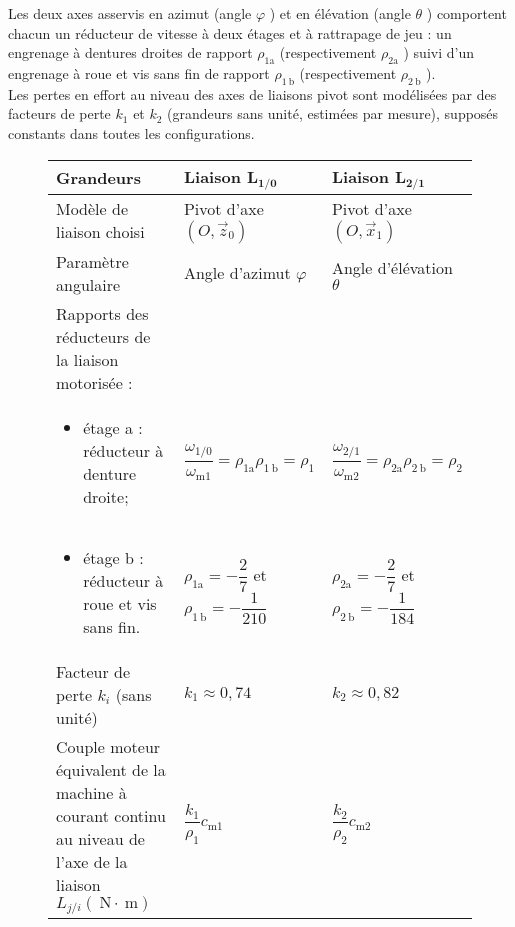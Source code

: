 Les deux axes asservis en azimut (angle $\varphi$ ) et en élévation (angle $\theta$ ) comportent chacun un réducteur de vitesse à deux étages et à rattrapage de jeu : un engrenage à dentures droites de rapport $\rho_{1 \mathrm{a}}$ (respectivement $\rho_{2 \mathrm{a}}$ ) suivi d'un engrenage à roue et vis sans fin de rapport $\rho_{1 \mathrm{~b}}$ (respectivement $\rho_{2 \mathrm{~b}}$ ).\\
Les pertes en effort au niveau des axes de liaisons pivot sont modélisées par des facteurs de perte $k_{1}$ et $k_{2}$ (grandeurs sans unité, estimées par mesure), supposés constants dans toutes les configurations.

\begin{figure}[!h]
\centering
\begin{tabular}{p{8cm}ll}
\hline
\textbf{Grandeurs} & \textbf{Liaison} $\boldsymbol{L}_{\mathbf{1 / 0}}$ & \textbf{Liaison} $\boldsymbol{L}_{\mathbf{2} / \mathbf{1}}$ \\
\hline
Modèle de liaison choisi & Pivot d'axe $\left(O, \vec{z}_{0}\right)$ & Pivot d'axe $\left(O, \vec{x}_{1}\right)$ \\

Paramètre angulaire & Angle d'azimut $\varphi$ & Angle d'élévation $\theta$ \\

Rapports des réducteurs de la liaison motorisée : & & \\

\begin{itemize}
\item étage a : réducteur à denture droite;
\end{itemize}
& $\dfrac{\omega_{1 / 0}}{\omega_{\mathrm{m} 1}}=\rho_{1 \mathrm{a}} \rho_{1 \mathrm{~b}}=\rho_{1}$ 
& $\dfrac{\omega_{2 / 1}}{\omega_{\mathrm{m} 2}}=\rho_{2 \mathrm{a}} \rho_{2 \mathrm{~b}}=\rho_{2}$ \\
\begin{itemize}
\item étage b : réducteur à roue et vis sans fin.
\end{itemize}
& $\rho_{1 \mathrm{a}}=-\dfrac{2}{7}$ et $\rho_{1 \mathrm{~b}}=-\dfrac{1}{210}$ & 
$\rho_{2 \mathrm{a}}=-\dfrac{2}{7}$ et $\rho_{2 \mathrm{~b}}=-\dfrac{1}{184}$\\

Facteur de perte $k_{i}$ (sans unité) &$k_{1} \approx 0,74$ & $k_{2} \approx 0,82$ \\

Couple moteur équivalent de la machine à courant continu au niveau de l'axe de la liaison $L_{j / i}(\mathrm{~N} \cdot \mathrm{~m})$  &
$\dfrac{k_{1}}{\rho_{1}} c_{\mathrm{m} 1}$ 
& $\dfrac{k_{2}}{\rho_{2}} c_{\mathrm{m} 2}$ \\


\end{tabular}
\end{figure}
